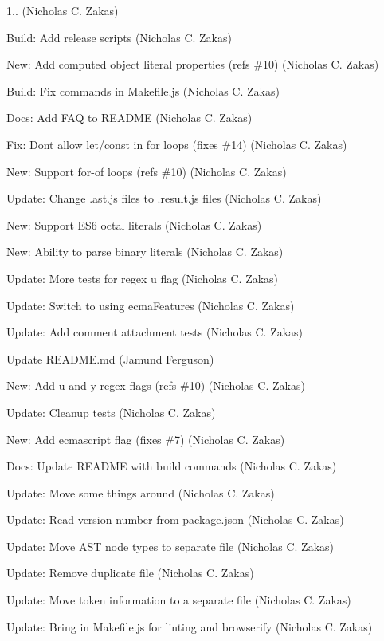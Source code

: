 \begin{DoxyItemize}
\item 1.. (Nicholas C. Zakas)
\item Build\+: Add release scripts (Nicholas C. Zakas)
\item New\+: Add computed object literal properties (refs \#10) (Nicholas C. Zakas)
\item Build\+: Fix commands in Makefile.\+js (Nicholas C. Zakas)
\item Docs\+: Add F\+AQ to R\+E\+A\+D\+ME (Nicholas C. Zakas)
\item Fix\+: Don\textquotesingle{}t allow let/const in for loops (fixes \#14) (Nicholas C. Zakas)
\item New\+: Support for-\/of loops (refs \#10) (Nicholas C. Zakas)
\item Update\+: Change .ast.\+js files to .result.\+js files (Nicholas C. Zakas)
\item New\+: Support E\+S6 octal literals (Nicholas C. Zakas)
\item New\+: Ability to parse binary literals (Nicholas C. Zakas)
\item Update\+: More tests for regex u flag (Nicholas C. Zakas)
\item Update\+: Switch to using ecma\+Features (Nicholas C. Zakas)
\item Update\+: Add comment attachment tests (Nicholas C. Zakas)
\item Update R\+E\+A\+D\+M\+E.\+md (Jamund Ferguson)
\item New\+: Add u and y regex flags (refs \#10) (Nicholas C. Zakas)
\item Update\+: Cleanup tests (Nicholas C. Zakas)
\item New\+: Add ecmascript flag (fixes \#7) (Nicholas C. Zakas)
\item Docs\+: Update R\+E\+A\+D\+ME with build commands (Nicholas C. Zakas)
\item Update\+: Move some things around (Nicholas C. Zakas)
\item Update\+: Read version number from package.\+json (Nicholas C. Zakas)
\item Update\+: Move A\+ST node types to separate file (Nicholas C. Zakas)
\item Update\+: Remove duplicate file (Nicholas C. Zakas)
\item Update\+: Move token information to a separate file (Nicholas C. Zakas)
\item Update\+: Bring in Makefile.\+js for linting and browserify (Nicholas C. Zakas)

\end{DoxyItemize}

